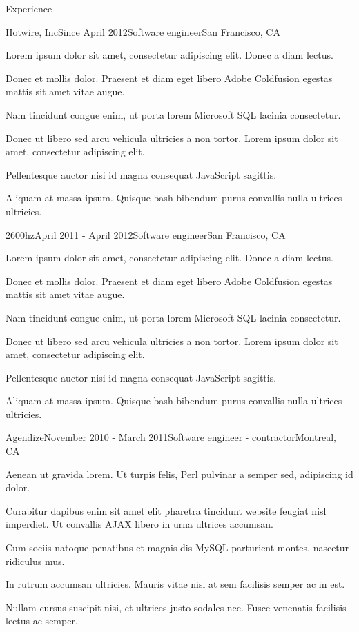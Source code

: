 \documentclass{resume} %
\begin{document}
\begin{rSection}{Experience}

\begin{rSubsection}{Hotwire, Inc}{Since April 2012}{Software engineer}{San Francisco, CA}
\item Lorem ipsum dolor sit amet, consectetur adipiscing elit. Donec a diam lectus.
\item Donec et mollis dolor. Praesent et diam eget libero Adobe Coldfusion egestas mattis sit amet vitae augue.
\item Nam tincidunt congue enim, ut porta lorem Microsoft SQL lacinia consectetur.
\item Donec ut libero sed arcu vehicula ultricies a non tortor. Lorem ipsum dolor sit amet, consectetur adipiscing elit.
\item Pellentesque auctor nisi id magna consequat JavaScript sagittis.
\item Aliquam at massa ipsum. Quisque bash bibendum purus convallis nulla ultrices ultricies.
\end{rSubsection}

\begin{rSubsection}{2600hz}{April 2011 - April 2012}{Software engineer}{San Francisco, CA}
\item Lorem ipsum dolor sit amet, consectetur adipiscing elit. Donec a diam lectus.
\item Donec et mollis dolor. Praesent et diam eget libero Adobe Coldfusion egestas mattis sit amet vitae augue.
\item Nam tincidunt congue enim, ut porta lorem Microsoft SQL lacinia consectetur.
\item Donec ut libero sed arcu vehicula ultricies a non tortor. Lorem ipsum dolor sit amet, consectetur adipiscing elit.
\item Pellentesque auctor nisi id magna consequat JavaScript sagittis.
\item Aliquam at massa ipsum. Quisque bash bibendum purus convallis nulla ultrices ultricies.
\end{rSubsection}


\begin{rSubsection}{Agendize}{November 2010 - March 2011}{Software engineer - contractor}{Montreal, CA}
\item Aenean ut gravida lorem. Ut turpis felis, Perl pulvinar a semper sed, adipiscing id dolor.
\item Curabitur dapibus enim sit amet elit pharetra tincidunt website feugiat nisl imperdiet. Ut convallis AJAX libero in urna ultrices accumsan.
\item Cum sociis natoque penatibus et magnis dis MySQL parturient montes, nascetur ridiculus mus.
\item In rutrum accumsan ultricies. Mauris vitae nisi at sem facilisis semper ac in est.
\item Nullam cursus suscipit nisi, et ultrices justo sodales nec. Fusce venenatis facilisis lectus ac semper.
\end{rSubsection}


\end{rSection}
\end{document}
